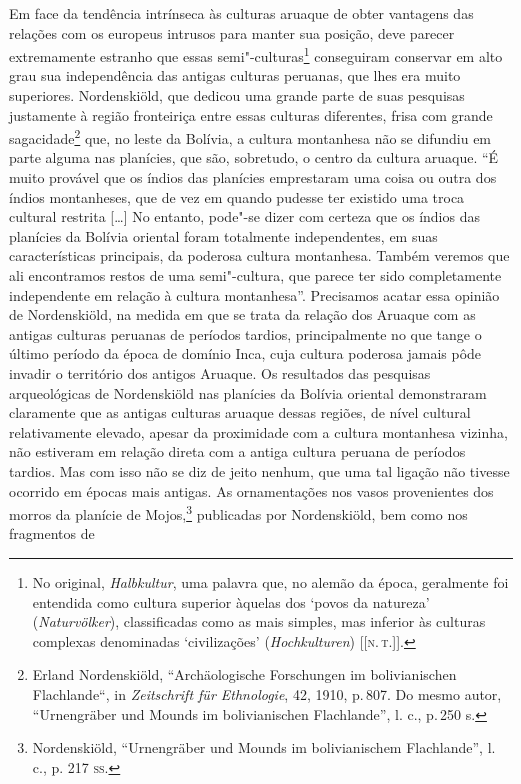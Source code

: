 Em face da tendência intrínseca às culturas aruaque de obter vantagens
das relações com os europeus intrusos para manter sua posição, deve
parecer extremamente estranho que essas semi"-culturas\footnote{No original,
  \textit{Halbkultur}, uma palavra que, no alemão da época, geralmente
  foi entendida como cultura superior àquelas dos `povos da natureza'
  (\textit{Naturvölker}), classificadas como as mais simples, mas inferior
  às culturas complexas denominadas `civilizações' (\textit{Hochkulturen})
  {[}{[}\textsc{n.\,t.}{]}{]}.} conseguiram
conservar em alto grau sua independência das antigas culturas peruanas,
que lhes era muito superiores. Nordenskiöld, que dedicou uma grande
parte de suas pesquisas justamente à região fronteiriça entre essas
culturas diferentes, frisa com grande sagacidade\footnote{Erland Nordenskiöld, ``Archäologische Forschungen im bolivianischen
  Flachlande``, in \textit{Zeitschrift für Ethnologie}, 42, 1910, p.\,807.
  Do mesmo autor, ``Urnengräber und Mounds im bolivianischen
  Flachlande'', l. c., p.\,250 s.} que, no leste da Bolívia, a cultura
montanhesa não se difundiu em parte alguma nas planícies, que são,
sobretudo, o centro da cultura aruaque. ``É muito provável que os índios
das planícies emprestaram uma coisa ou outra dos índios montanheses,
que de vez em quando pudesse ter existido uma troca cultural restrita
{[}\ldots{}{]} No entanto, pode"-se dizer com certeza que os índios das
planícies da Bolívia oriental foram totalmente independentes, em suas
características principais, da poderosa cultura montanhesa. Também
veremos que ali encontramos restos de uma semi"-cultura, que parece ter
sido completamente independente em relação à cultura montanhesa''.
Precisamos acatar essa opinião de Nordenskiöld, na medida em que se
trata da relação dos Aruaque com as antigas culturas peruanas de
períodos tardios, principalmente no que tange o último período da época
de domínio Inca, cuja cultura poderosa jamais pôde invadir o território
dos antigos Aruaque. Os resultados das pesquisas arqueológicas de
Nordenskiöld nas planícies da Bolívia oriental demonstraram claramente
que as antigas culturas aruaque dessas regiões, de nível cultural
relativamente elevado, apesar da proximidade com a cultura montanhesa
vizinha, não estiveram em relação direta com a antiga cultura peruana de
períodos tardios. Mas com isso não se diz de jeito nenhum, que uma tal
ligação não tivesse ocorrido em épocas mais antigas. As ornamentações
nos vasos provenientes dos morros da planície de Mojos,\footnote{Nordenskiöld,
  ``Urnengräber und Mounds im bolivianischem Flachlande'', l. c., p.
  217 \textsc{ss}.} publicadas por Nordenskiöld, bem como nos fragmentos de
